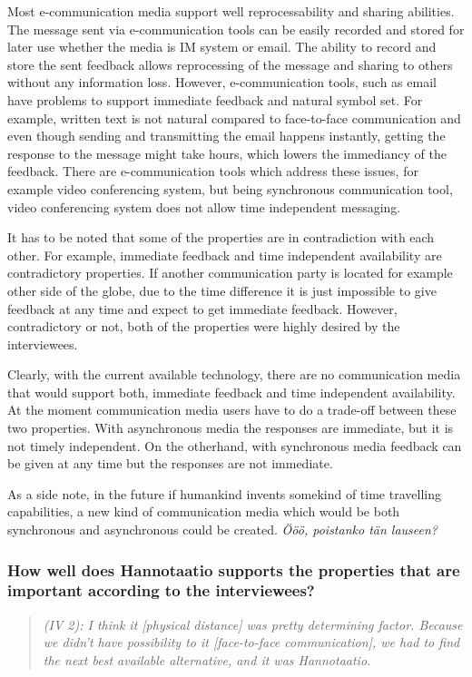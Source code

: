 \documentclass[english,12pt,a4paper,pdftex]{article}
\newcommand{\q}[2]{
\begin{quote}
\emph{(IV #1): #2}
\end{quote}}
\begin{document}
Most e-communication media support well reprocessability and sharing abilities. The message sent via e-communication tools can be easily recorded and stored for later use whether the media is \ac{IM} system or email. The ability to record and store the sent feedback allows reprocessing of the message and sharing to others without any information loss. However, e-communication tools, such as email have problems to support immediate feedback and natural symbol set. For example, written text is not natural compared to face-to-face communication and even though sending and transmitting the email happens instantly, getting the response to the message might take hours, which lowers the immediancy of the feedback. There are e-communication tools which address these issues, for example video conferencing system, but being synchronous communication tool, video conferencing system does not allow time independent messaging.

It has to be noted that some of the properties are in contradiction with each other. For example, immediate feedback and time independent availability are contradictory properties. If another communication party is located for example other side of the globe, due to the time difference it is just impossible to give feedback at any time and expect to get immediate feedback. However, contradictory or not, both of the properties were highly desired by the interviewees.

Clearly, with the current available technology, there are no communication media that would support both, immediate feedback and time independent availability. At the moment communication media users have to do a trade-off between these two properties. With asynchronous media the responses are immediate, but it is not timely independent. On the otherhand, with synchronous media feedback can be given at any time but the responses are not immediate.

As a side note, in the future if humankind invents somekind of time travelling capabilities, a new kind of communication media which would be both synchronous and asynchronous could be created. \emph{Ööö, poistanko tän lauseen?}

\subsubsection{How well does Hannotaatio supports the properties that are important according to the interviewees?}

\q{2}{I think it [physical distance] was pretty determining factor. Because we didn't have possibility to it [face-to-face communication], we had to find the next best available alternative, and it was Hannotaatio.}
\end{document}
